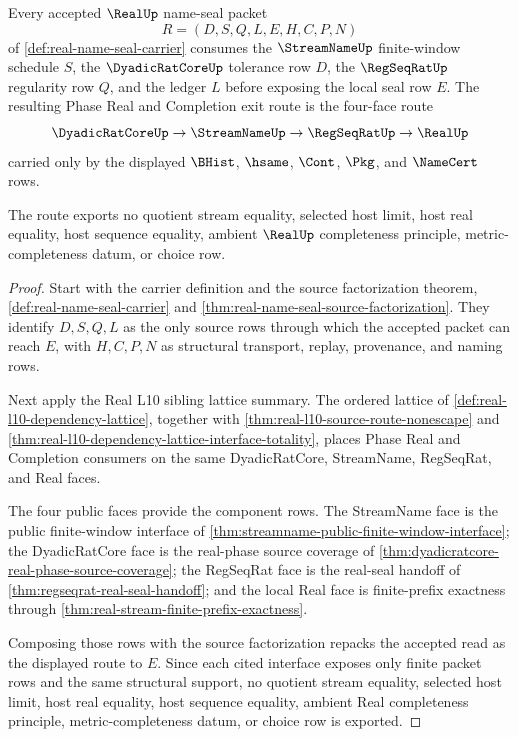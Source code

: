 \begin{theorem}
\label{thm:real-streamname-regseqrat-seal-route}
Every accepted $\RealUp$ name-seal packet
$$
R=(D,S,Q,L,E,H,C,P,N)
$$
of \autoref{def:real-name-seal-carrier} consumes the $\StreamNameUp$ finite-window schedule $S$, the $\DyadicRatCoreUp$ tolerance row $D$, the $\RegSeqRatUp$ regularity row $Q$, and the ledger $L$ before exposing the local seal row $E$. The resulting Phase Real and Completion exit route is the four-face route
$$
\DyadicRatCoreUp \to \StreamNameUp \to \RegSeqRatUp \to \RealUp
$$
carried only by the displayed $\BHist$, $\hsame$, $\Cont$, $\Pkg$, and $\NameCert$ rows.

The route exports no quotient stream equality, selected host limit, host real equality, host sequence equality, ambient $\RealUp$ completeness principle, metric-completeness datum, or choice row.
\end{theorem}
\begin{proof}
Start with the carrier definition and the source factorization theorem, \autoref{def:real-name-seal-carrier} and \autoref{thm:real-name-seal-source-factorization}. They identify $D,S,Q,L$ as the only source rows through which the accepted packet can reach $E$, with $H,C,P,N$ as structural transport, replay, provenance, and naming rows.

Next apply the Real L10 sibling lattice summary. The ordered lattice of \autoref{def:real-l10-dependency-lattice}, together with \autoref{thm:real-l10-source-route-nonescape} and \autoref{thm:real-l10-dependency-lattice-interface-totality}, places Phase Real and Completion consumers on the same DyadicRatCore, StreamName, RegSeqRat, and Real faces.

The four public faces provide the component rows. The StreamName face is the public finite-window interface of \autoref{thm:streamname-public-finite-window-interface}; the DyadicRatCore face is the real-phase source coverage of \autoref{thm:dyadicratcore-real-phase-source-coverage}; the RegSeqRat face is the real-seal handoff of \autoref{thm:regseqrat-real-seal-handoff}; and the local Real face is finite-prefix exactness through \autoref{thm:real-stream-finite-prefix-exactness}.

Composing those rows with the source factorization repacks the accepted read as the displayed route to $E$. Since each cited interface exposes only finite packet rows and the same structural support, no quotient stream equality, selected host limit, host real equality, host sequence equality, ambient Real completeness principle, metric-completeness datum, or choice row is exported.
\end{proof}

